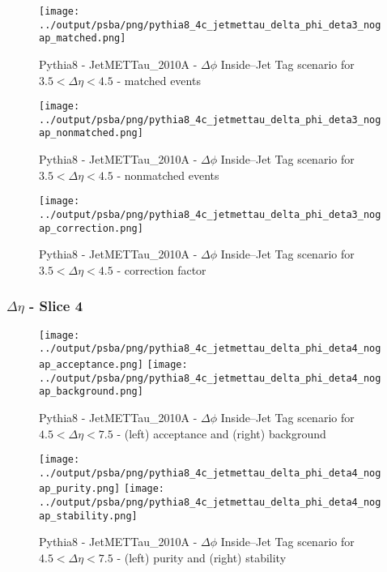 \documentclass[11pt]{book}
\begin{document}
\begin{figure}[ht]
\centering
\texttt{[image: ../output/psba/png/pythia8\_4c\_jetmettau\_delta\_phi\_deta3\_nogap\_matched.png]}
\caption{Pythia8 - JetMETTau\_2010A - $\Delta\phi$ Inside--Jet Tag scenario for $3.5 < \Delta\eta < 4.5$ - matched events}
\label{fig:p8_jetmettau_delta_phi_deta3_nogap_matched}
\end{figure}

\begin{figure}[ht]
\centering
\texttt{[image: ../output/psba/png/pythia8\_4c\_jetmettau\_delta\_phi\_deta3\_nogap\_nonmatched.png]}
\caption{Pythia8 - JetMETTau\_2010A - $\Delta\phi$ Inside--Jet Tag scenario for $3.5 < \Delta\eta < 4.5$ - nonmatched events}
\label{fig:p8_jetmettau_delta_phi_deta3_nogap_nonmatched}
\end{figure}

\begin{figure}[ht]
\centering
\texttt{[image: ../output/psba/png/pythia8\_4c\_jetmettau\_delta\_phi\_deta3\_nogap\_correction.png]}
\caption{Pythia8 - JetMETTau\_2010A - $\Delta\phi$ Inside--Jet Tag scenario for $3.5 < \Delta\eta < 4.5$ - correction factor}
\label{fig:p8_jetmettau_delta_phi_deta3_nogap_correction}
\end{figure}


\clearpage
\subsubsection{$\Delta\eta$ - Slice 4}
\begin{figure}[ht]
\centering
\texttt{[image: ../output/psba/png/pythia8\_4c\_jetmettau\_delta\_phi\_deta4\_nogap\_acceptance.png]}
\texttt{[image: ../output/psba/png/pythia8\_4c\_jetmettau\_delta\_phi\_deta4\_nogap\_background.png]}
\caption{Pythia8 - JetMETTau\_2010A - $\Delta\phi$ Inside--Jet Tag scenario for $4.5 < \Delta\eta < 7.5$ - (left) acceptance and (right) background}
\label{fig:p8_jetmettau_delta_phi_deta4_nogap_ab}
\end{figure}

\begin{figure}[ht]
\centering
\texttt{[image: ../output/psba/png/pythia8\_4c\_jetmettau\_delta\_phi\_deta4\_nogap\_purity.png]}
\texttt{[image: ../output/psba/png/pythia8\_4c\_jetmettau\_delta\_phi\_deta4\_nogap\_stability.png]}
\caption{Pythia8 - JetMETTau\_2010A - $\Delta\phi$ Inside--Jet Tag scenario for $4.5 < \Delta\eta < 7.5$ - (left) purity and (right) stability}
\label{fig:p8_jetmettau_delta_phi_deta4_nogap_ps}
\end{figure}
\end{document}
